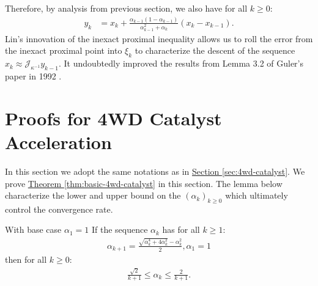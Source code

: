 \documentclass[12pt]{article}
\begin{document}
\begin{remark}
            Therefore, by analysis from previous section, we also have for all $k \ge 0$: 
            \begin{align*}
                y_k &= x_k + \frac{\alpha_{k - 1}(1 - \alpha_{k - 1})}{\alpha_{k - 1}^2 + \alpha_k}
                (x_k - x_{k - 1}).
            \end{align*}
            Lin's innovation of the inexact proximal inequality allows us to roll the error from the inexact proximal point into $\xi_k$ to characterize the descent of the sequence $x_k \approx \mathcal J_{\kappa^{-1}}y_{k - 1}$. 
            It undoubtedly improved the results from Lemma 3.2 of Guler's paper in 1992 \cite{guler_new_1992}. 
        \end{remark}

\section{Proofs for 4WD Catalyst Acceleration}
    In this section we adopt the same notations as in 
    \hyperref[sec:4wd-catalyst]{Section \ref*{sec:4wd-catalyst}}. 
    We prove
    \hyperref[thm:basic-4wd-catalyst]{Theorem \ref*{thm:basic-4wd-catalyst}}
    in this section. 
    The lemma below characterize the lower and upper bound on the $(\alpha_k)_{k \ge 0}$ which ultimately control the convergence rate. 
    \begin{lemma}\label{app:lemma:momentum-sequence-bounds}
        With base case $\alpha_1 = 1$
        If the sequence $\alpha_k$ has for all $k\ge 1$: 
        \begin{align*}
            \alpha_{k + 1} = \frac{\sqrt{\alpha_k^4 + 4\alpha_k^2} - \alpha_k^2}{2}, \alpha_1 = 1
        \end{align*}
        then for all $k \ge0$: 
        \begin{align*}
            \frac{\sqrt{2}}{k + 1} \le \alpha_k \le \frac{2}{k + 1}. 
        \end{align*}
    \end{lemma}
\end{document}
